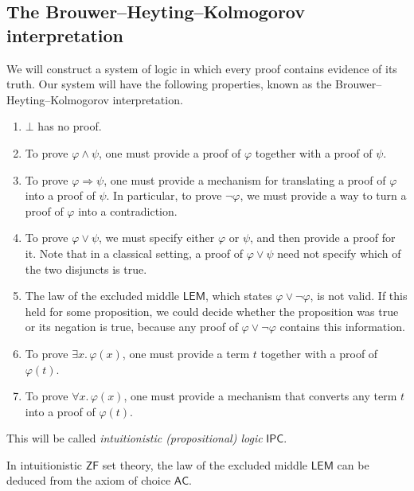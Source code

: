\subsection{The Brouwer--Heyting--Kolmogorov interpretation}
We will construct a system of logic in which every proof contains evidence of its truth.
Our system will have the following properties, known as the Brouwer--Heyting--Kolmogorov interpretation.
\begin{enumerate}
    \item \( \bot \) has no proof.
    \item To prove \( \varphi \wedge \psi \), one must provide a proof of \( \varphi \) together with a proof of \( \psi \).
    \item To prove \( \varphi \Rightarrow \psi \), one must provide a mechanism for translating a proof of \( \varphi \) into a proof of \( \psi \).
    In particular, to prove \( \neg\varphi \), we must provide a way to turn a proof of \( \varphi \) into a contradiction.
    \item To prove \( \varphi \vee \psi \), we must specify either \( \varphi \) or \( \psi \), and then provide a proof for it.
    Note that in a classical setting, a proof of \( \varphi \vee \psi \) need not specify which of the two disjuncts is true.
    \item The law of the excluded middle \( \mathsf{LEM} \), which states \( \varphi \vee \neg \varphi \), is not valid.
    If this held for some proposition, we could decide whether the proposition was true or its negation is true, because any proof of \( \varphi \vee \neg \varphi \) contains this information.
    \item To prove \( \exists x.\, \varphi(x) \), one must provide a term \( t \) together with a proof of \( \varphi(t) \).
    \item To prove \( \forall x.\, \varphi(x) \), one must provide a mechanism that converts any term \( t \) into a proof of \( \varphi(t) \).
\end{enumerate}
This will be called \emph{intuitionistic (propositional) logic} \( \mathsf{IPC} \).
\begin{theorem}[Diaconescu]
    In intuitionistic \( \mathsf{ZF} \) set theory, the law of the excluded middle \( \mathsf{LEM} \) can be deduced from the axiom of choice \( \mathsf{AC} \).
\end{theorem}
